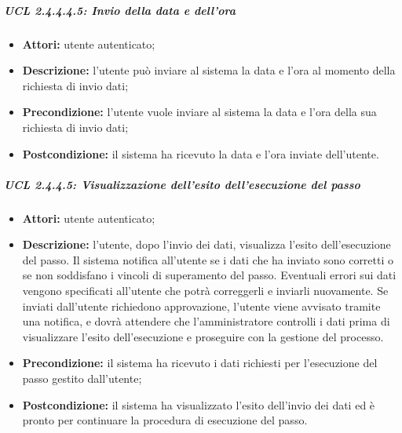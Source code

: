 \subparagraph{UCL 2.4.4.4.5: Invio della data e dell'ora}
\begin{itemize}
\item \textbf{Attori:} utente autenticato;
\item \textbf{Descrizione:} l'utente può inviare al sistema la data e l'ora al momento della richiesta di invio dati;
\item \textbf{Precondizione:} l'utente vuole inviare al sistema la data e l'ora della sua richiesta di invio dati;
\item \textbf{Postcondizione:} il sistema ha ricevuto la data e l'ora inviate dell'utente.
\end{itemize}

\subparagraph{UCL 2.4.4.5: Visualizzazione dell'esito dell'esecuzione del passo}
\begin{itemize}
\item \textbf{Attori:} utente autenticato;
\item \textbf{Descrizione:} l'utente, dopo l'invio dei dati, visualizza l'esito dell'esecuzione del passo. Il sistema notifica all'utente se i dati che ha inviato sono corretti o se non soddisfano i vincoli di superamento del passo.
Eventuali errori sui dati vengono specificati all'utente che potrà correggerli e inviarli nuovamente.
Se inviati dall'utente richiedono approvazione, l'utente viene avvisato tramite una notifica, e dovrà attendere che l'amministratore controlli i dati prima di visualizzare l'esito dell'esecuzione e proseguire con la gestione del processo.
\item \textbf{Precondizione:} il sistema ha ricevuto i dati richiesti per l'esecuzione del passo gestito dall'utente;
\item \textbf{Postcondizione:} il sistema ha visualizzato l'esito dell'invio dei dati ed è pronto per continuare la procedura di esecuzione del passo.
\end{itemize}

